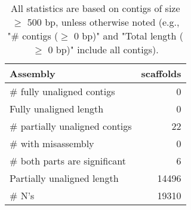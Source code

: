\documentclass[12pt,a4paper]{article}
\begin{document}
\begin{table}[ht]
\begin{center}
\caption{All statistics are based on contigs of size $\geq$ 500 bp, unless otherwise noted (e.g., "\# contigs ($\geq$ 0 bp)" and "Total length ($\geq$ 0 bp)" include all contigs).}
\begin{tabular}{|l*{1}{|r}|}
\hline
Assembly & scaffolds \\ \hline
\# fully unaligned contigs & 0 \\ \hline
Fully unaligned length & 0 \\ \hline
\# partially unaligned contigs & 22 \\ \hline
\hspace{5mm}\# with misassembly & 0 \\ \hline
\hspace{5mm}\# both parts are significant & 6 \\ \hline
Partially unaligned length & 14496 \\ \hline
\# N's & 19310 \\ \hline
\end{tabular}
\end{center}
\end{table}
\end{document}
